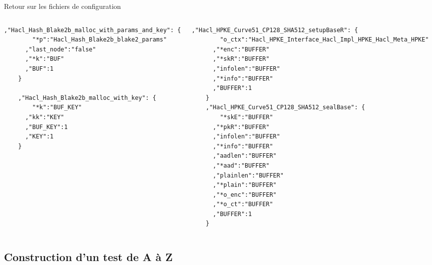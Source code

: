 \documentclass[A4,svgnames,9pt,aspectratio=169]{beamer}
\begin{document}
\begin{frame}[fragile]{Retour sur les fichiers de configuration}
\begin{columns}
  \begin{column}{0.5\textwidth}
    \begin{lstlisting}[style=CStyle, basicstyle=\tiny\ttfamily,gobble=4, caption={Hacl\_Hash\_Blake2b.h}, label={lst:Hacl_Hash_Blake2b_h}]
    ,"Hacl_Hash_Blake2b_malloc_with_params_and_key": {
        "*p":"Hacl_Hash_Blake2b_blake2_params"
      ,"last_node":"false"
      ,"*k":"BUF"
      ,"BUF":1
    }

    ,"Hacl_Hash_Blake2b_malloc_with_key": {
        "*k":"BUF_KEY"
      ,"kk":"KEY"
      ,"BUF_KEY":1
      ,"KEY":1
    }
    \end{lstlisting}
    
  \end{column}

  \begin{column}{0.5\textwidth}
    \begin{lstlisting}[style=CStyle, basicstyle=\tiny\ttfamily, caption={Hacl\_HPKE\_Curve51\_CP128\_SHA512.h}, gobble=4]
     ,"Hacl_HPKE_Curve51_CP128_SHA512_setupBaseR": {
        "o_ctx":"Hacl_HPKE_Interface_Hacl_Impl_HPKE_Hacl_Meta_HPKE"
      ,"*enc":"BUFFER"
      ,"*skR":"BUFFER"
      ,"infolen":"BUFFER"
      ,"*info":"BUFFER"
      ,"BUFFER":1
    }
    ,"Hacl_HPKE_Curve51_CP128_SHA512_sealBase": {
        "*skE":"BUFFER"
      ,"*pkR":"BUFFER"
      ,"infolen":"BUFFER"
      ,"*info":"BUFFER"
      ,"aadlen":"BUFFER"
      ,"*aad":"BUFFER"
      ,"plainlen":"BUFFER"
      ,"*plain":"BUFFER"
      ,"*o_enc":"BUFFER"
      ,"*o_ct":"BUFFER"
      ,"BUFFER":1
    }
  \end{lstlisting}
  \end{column}
\end{columns}
  
\end{frame}



\subsection{Construction d'un test de A à Z}
\frame{\subsectionpage}
\end{document}
